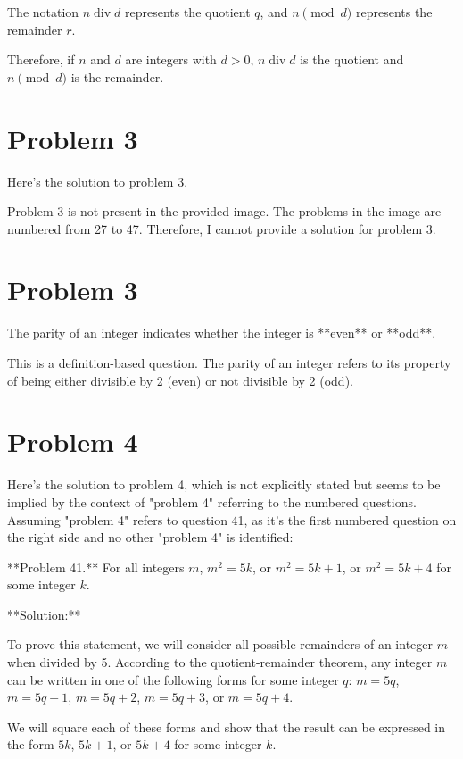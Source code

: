 \documentclass{article}
\begin{document}
The notation $n \operatorname{div} d$ represents the quotient $q$, and $n \pmod{d}$ represents the remainder $r$.

Therefore, if $n$ and $d$ are integers with $d > 0$, $n \operatorname{div} d$ is the quotient and $n \pmod{d}$ is the remainder.

\newpage

\section*{Problem 3}
Here's the solution to problem 3.

Problem 3 is not present in the provided image. The problems in the image are numbered from 27 to 47. Therefore, I cannot provide a solution for problem 3.

\newpage

\section*{Problem 3}
The parity of an integer indicates whether the integer is **even** or **odd**.

This is a definition-based question. The parity of an integer refers to its property of being either divisible by 2 (even) or not divisible by 2 (odd).

\newpage

\section*{Problem 4}
Here's the solution to problem 4, which is not explicitly stated but seems to be implied by the context of "problem 4" referring to the numbered questions. Assuming "problem 4" refers to question 41, as it's the first numbered question on the right side and no other "problem 4" is identified:

**Problem 41.** For all integers $m$, $m^2 = 5k$, or $m^2 = 5k+1$, or $m^2 = 5k+4$ for some integer $k$.

**Solution:**

To prove this statement, we will consider all possible remainders of an integer $m$ when divided by 5. According to the quotient-remainder theorem, any integer $m$ can be written in one of the following forms for some integer $q$:
$m = 5q$, $m = 5q+1$, $m = 5q+2$, $m = 5q+3$, or $m = 5q+4$.

We will square each of these forms and show that the result can be expressed in the form $5k$, $5k+1$, or $5k+4$ for some integer $k$.
\end{document}
